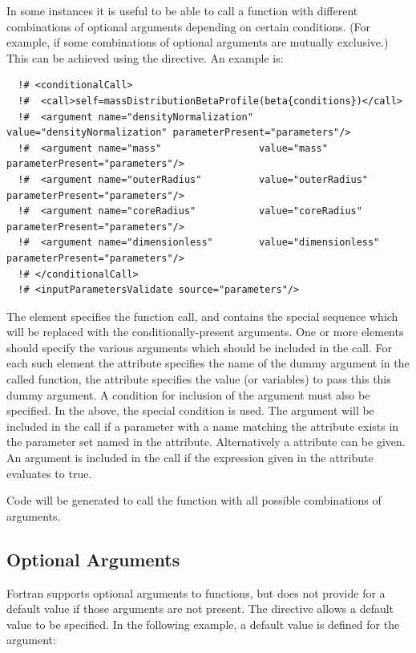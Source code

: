 In some instances it is useful to be able to call a function with different combinations of optional arguments depending on certain conditions. (For example, if some combinations of optional arguments are mutually exclusive.) This can be achieved using the  directive. An example is:
\begin{verbatim}
  !# <conditionalCall>
  !#  <call>self=massDistributionBetaProfile(beta{conditions})</call>
  !#  <argument name="densityNormalization" value="densityNormalization" parameterPresent="parameters"/>
  !#  <argument name="mass"                 value="mass"                 parameterPresent="parameters"/>
  !#  <argument name="outerRadius"          value="outerRadius"          parameterPresent="parameters"/>
  !#  <argument name="coreRadius"           value="coreRadius"           parameterPresent="parameters"/>
  !#  <argument name="dimensionless"        value="dimensionless"        parameterPresent="parameters"/>
  !# </conditionalCall>
  !# <inputParametersValidate source="parameters"/>
\end{verbatim}
The  element specifies the function call, and contains the special sequence  which will be replaced with the conditionally-present arguments. One or more  elements should specify the various arguments which should be included in the call. For each such element the  attribute specifies the name of the dummy argument in the called function, the  attribute specifies the value (or variables) to pass this this dummy argument. A condition for inclusion of the argument must also be specified. In the above, the special  condition is used. The argument will be included in the call if a parameter with a name matching the  attribute exists in the parameter set named in the  attribute. Alternatively a  attribute can be given. An argument is included in the call if the expression given in the  attribute evaluates to true.

Code will be generated to call the function with all possible combinations of arguments.

\subsection{Optional Arguments}

Fortran supports optional arguments to functions, but does not provide for a default value if those arguments are not present. The  directive allows a default value to be specified. In the following example, a default value is defined for the  argument:

